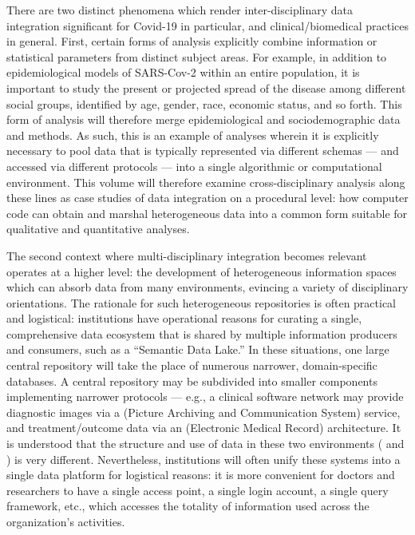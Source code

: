 \documentclass{statsoc}
\newcommand{\p}[1]{

\vspace{.75em}#1}
\newcommand{\textscc}[1]{{\color{orr!35!black}{{%
						\fontfamily{Cabin-TLF}\fontseries{b}\selectfont{\textsc{\scriptsize{#1}}}}}}}
\newcommand{\AcronymText}[1]{{\textscc{#1}}}
\newcommand{\q}[1]{{\fontfamily{qcr}\selectfont ``}#1{\fontfamily{qcr}\selectfont ''}}
\newcommand{\PACS}{\resizebox{!}{7pt}{\AcronymText{PACS}}}
\newcommand{\EMR}{\resizebox{!}{7pt}{\AcronymText{EMR}}}
\begin{document}
{\p{There are two distinct phenomena which render 
inter-disciplinary data integration significant for 
Covid-19 in particular, and clinical/biomedical practices 
in general.  First, certain forms of analysis explicitly 
combine information or statistical parameters from 
distinct subject areas.  For example, in addition 
to epidemiological models of SARS-Cov-2 within an 
entire population, it is important to study the 
present or projected spread of the disease among 
different social groups, identified by age, gender, 
race, economic status, and so forth.  This form 
of analysis will therefore merge epidemiological 
and sociodemographic data and methods.  As such, this is an 
example of analyses wherein it is explicitly necessary 
to pool data that is typically represented 
via different schemas --- and accessed via different 
protocols --- into a single algorithmic or computational 
environment.  This volume will therefore 
examine cross-disciplinary analysis along these 
lines as case studies of data integration on a procedural 
level: how computer code can obtain and marshal heterogeneous 
data into a common form suitable for 
qualitative and quantitative analyses.} 
   
\p{The second context where multi-disciplinary integration 
becomes relevant operates at a higher level: the development 
of heterogeneous information spaces which can absorb 
data from many environments, evincing a variety of 
disciplinary orientations.  The rationale for such heterogeneous 
repositories is often practical and logistical: institutions 
have operational reasons for curating a single, comprehensive data ecosystem 
that is shared by multiple information producers and consumers, 
such as a \q{Semantic Data Lake.}  In these situations, one 
large central repository will take the place of numerous 
narrower, domain-specific databases.  A central repository 
may be subdivided into smaller components implementing 
narrower protocols --- e.g., a clinical software network may provide 
diagnostic images via a \PACS{} (Picture Archiving and Communication 
System) service, and treatment/outcome data via an 
\EMR{} (Electronic Medical Record) architecture.  It is understood 
that the structure and use of data in these two environments 
(\PACS{} and \EMR{}) is very different.  Nevertheless, 
institutions will often unify these systems into 
a single data platform for logistical reasons: it 
is more convenient for doctors and researchers to 
have a single access point, a single login account, 
a single query framework, etc., which accesses the 
totality of information used across the organization's 
activities.}

}
\end{document}
